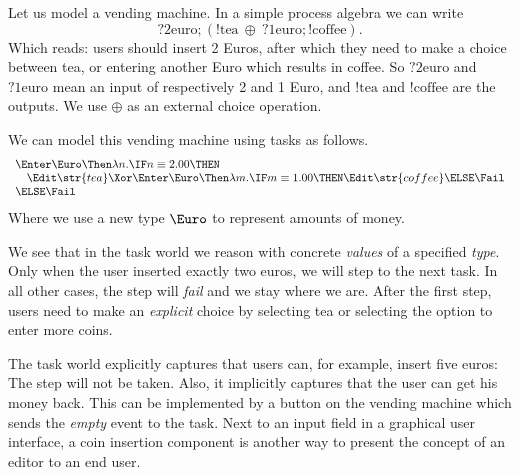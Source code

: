 Let us model a vending machine.
In a simple process algebra we can write
\begin{equation*}
  ?\text{2euro}; (!\text{tea}\ \oplus\ ?\text{1euro}; !\text{coffee}).
\end{equation*}
Which reads:
users should insert 2 Euros,
after which they need to make a choice between tea,
or entering another Euro which results in coffee.
So $?\text{2euro}$ and $?\text{1euro}$ mean an input of respectively 2 and 1 Euro,
and $!\text{tea}$ and $!\text{coffee}$ are the outputs.
We use $\oplus$ as an external choice operation.

We can model this vending machine using tasks as follows.
\begin{equation*}
  \begin{array}{l}
    \Enter \Euro \Then \lambda n.
    \IF n \equiv 2.00 \THEN \\
     \quad \Edit \str{tea}
      \Xor
        \Enter \Euro \Then \lambda m.
        \IF m \equiv 1.00 \THEN
          \Edit \str{coffee}
        \ELSE
          \Fail \\
    \ELSE \Fail
  \end{array}
\end{equation*}
Where we use a new type $\Euro$ to represent amounts of money.

We see that in the task world we reason with concrete \emph{values} of a specified \emph{type}.
Only when the user inserted exactly two euros,
we will step to the next task.
In all other cases,
the step will \emph{fail} and we stay where we are.
After the first step,
users need to make an \emph{explicit} choice by selecting tea or selecting the option to enter more coins.

The task world explicitly captures that users can, for example, insert five euros:
The step will not be taken.
Also, it implicitly captures that the user can get his money back.
This can be implemented by a button on the vending machine which sends the \emph{empty} event to the task.
Next to an input field in a graphical user interface,
a coin insertion component is another way to present the concept of an editor to an end user.


